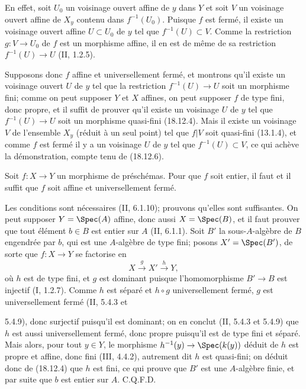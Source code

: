 En effet, soit $U_0$ un voisinage ouvert affine de $y$ dans $Y$ et soit $V$ un voisinage ouvert affine de $X_y$ contenu dans $f^{-1}(U_0)$. Puisque $f$ est fermé, il existe un voisinage ouvert affine $U\subset U_0$ de $y$ tel que $f^{-1}(U)\subset V$. Comme la restriction $g:V\to U_0$ de $f$ est un morphisme affine, il en est de même de sa restriction $f^{-1}(U)\to U$ (II, 1.2.5).

Supposons donc $f$ affine et universellement fermé, et montrons qu'il existe un voisinage ouvert $U$ de $y$ tel que la restriction $f^{-1}(U)\to U$ soit un morphisme fini; comme on peut supposer $Y$ et $X$ affines, on peut supposer $f$ de type fini, donc propre, et il suffit de prouver qu'il existe un voisinage $U$ de $y$ tel que $f^{-1}(U)\to U$ soit un morphisme quasi-fini (18.12.4). Mais il existe un voisinage $V$ de l'ensemble $X_y$ (réduit à un seul point) tel que $f|V$ soit quasi-fini (13.1.4), et comme $f$ est fermé il y a un voisinage $U$ de $y$ tel que $f^{-1}(U)\subset V$, ce qui achève la démonstration, compte tenu de (18.12.6).

\begin{proposition}[18.12.8]
\label{IV.18.12.8}
Soit $f:X\to Y$ un morphisme de préschémas. Pour que $f$ soit entier, il faut et il suffit que $f$ soit affine et universellement fermé.
\end{proposition}

Les conditions sont nécessaires (II, 6.1.10); prouvons qu'elles sont suffisantes. On peut supposer $Y=\Spec(A)$ affine, donc aussi $X=\Spec(B)$, et il faut prouver que tout élément $b\in B$ est entier sur $A$ (II, 6.1.1). Soit $B'$ la sous-$A$-algèbre de $B$ engendrée par $b$, qui est une $A$-algèbre de type fini; posons $X'=\Spec(B')$, de sorte que $f:X\to Y$ se factorise en
\[
  X\xrightarrow{g}X'\xrightarrow{h}Y,
\]
où $h$ est de type fini, et $g$ est dominant puisque l'homomorphisme $B'\to B$ est injectif (I, 1.2.7). Comme $h$ est séparé et $h\circ g$ universellement fermé, $g$ est universellement fermé (II, 5.4.3 et


5.4.9), donc surjectif puisqu'il est dominant; on en conclut (II, 5.4.3 et 5.4.9) que $h$ est aussi universellement fermé, donc propre puisqu'il est de type fini et séparé. Mais alors, pour tout $y\in Y$, le morphisme $h^{-1}(y)\to\Spec(k(y))$ déduit de $h$ est propre et affine, donc fini (III, 4.4.2), autrement dit $h$ est quasi-fini; on déduit donc de (18.12.4) que $h$ est fini, ce qui prouve que $B'$ est une $A$-algèbre finie, et par suite que $b$ est entier sur $A$. C.Q.F.D.

